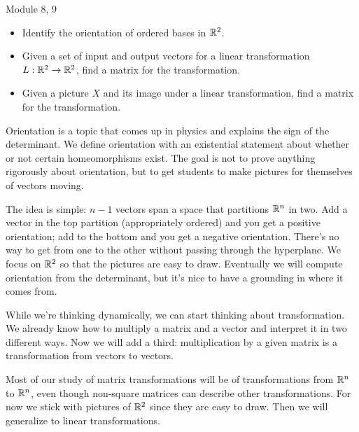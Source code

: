 \documentclass{workbook}
\begin{document}
\begin{lesson}

	Module 8, 9

	\begin{itemize}
		\item Identify the orientation of ordered bases in $\mathbb{R}^2$.
		\item Given a set of input and output vectors for a
			linear transformation $L:\mathbb{R}^2\to\mathbb{R}^2$, find
			a matrix for the transformation.
		\item Given a picture $X$ and its image under a linear transformation,
			find a matrix for the transformation.
	\end{itemize}

	Orientation is a topic that comes up in physics and explains the sign
	of the determinant. We define orientation with an existential statement
	about whether or not certain homeomorphisms exist. The goal is not to
	prove anything rigorously about orientation, but to get students to
	make pictures for themselves of vectors moving.

	The idea is simple: $n-1$ vectors span a space that partitions $\mathbb{R}^n$ in
	two. Add a vector in the top partition (appropriately ordered) and you get
	a positive orientation; add to the bottom and you get a negative orientation.
	There's no way to get from one to the other without passing through the
	hyperplane. We focus on $\mathbb{R}^2$ so that the pictures are easy to draw.
	Eventually we will compute orientation from the determinant, but it's nice
	to have a grounding in where it comes from.

	While we're thinking dynamically, we can start thinking about transformation.
	We already know how to multiply a matrix and a vector and interpret it in
	two different ways. Now we will add a third: multiplication by a given
	matrix is a transformation from vectors to vectors.

	Most of our study of matrix transformations will be of transformations from $\mathbb{R}^n$
	to $\mathbb{R}^n$, even though non-square matrices can describe other transformations.
	For now we stick with pictures of $\mathbb{R}^2$ since they are easy to draw. Then
	we will generalize to linear transformations.

\end{lesson}
\end{document}
